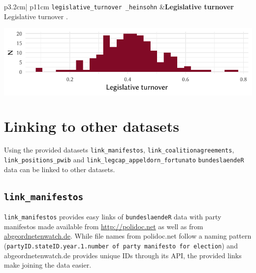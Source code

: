 \documentclass[
]{scrartcl}
\begin{document}
\begin{longtable}{p{3.2cm}| p{11cm}}
\texttt{legislative\_turnover
\_heinsohn} &\textbf{Legislative turnover \parencite{heinsohnInstitutionalDeterminantsLegislative2014}}\newline 
Legislative turnover \parencite{heinsohnInstitutionalDeterminantsLegislative2014}.



\hspace*{.25cm}
\begin{minipage}[t]{\linewidth }
\vspace{0pt}
\includegraphics[width = \linewidth]{cbfiles/turnoverplot.pdf}
\end{minipage}



\end{longtable}

\clearpage

\hypertarget{linking-to-other-datasets}{%
\section{Linking to other datasets}\label{linking-to-other-datasets}}

Using the provided datasets \texttt{link\_manifestos},
\texttt{link\_coalitionagreements}, \texttt{link\_positions\_pwib} and
\texttt{link\_legcap\_appeldorn\_fortunato} \texttt{bundeslaendeR} data
can be linked to other datasets.

\hypertarget{link_manifestos}{%
\subsection{\texorpdfstring{\texttt{link\_manifestos}}{link\_manifestos}}\label{link_manifestos}}

\texttt{link\_manifestos} provides easy links of \texttt{bundeslaendeR}
data with party manifestos made available from \url{http://polidoc.net}
\parencites{benoitChallengesEstimatingPolicy2009}{grossDoesEURegional2018}{pappiPolitikpositionenDeutschenLandtagsparteien2014}{pappiPartyElectionProgrammes2009}[for the codebook see][]{brauningerPolidocNetCodebook2018}
as well as from \url{abgeordnetenwatch.de}. While file names from
polidoc.net follow a naming pattern
(\texttt{{partyID}.{stateID}.{year}.{1}.{number of party manifesto for election}})
and abgeordnetenwatch.de provides unique IDs through its API, the
provided links make joining the data easier.
\end{document}

